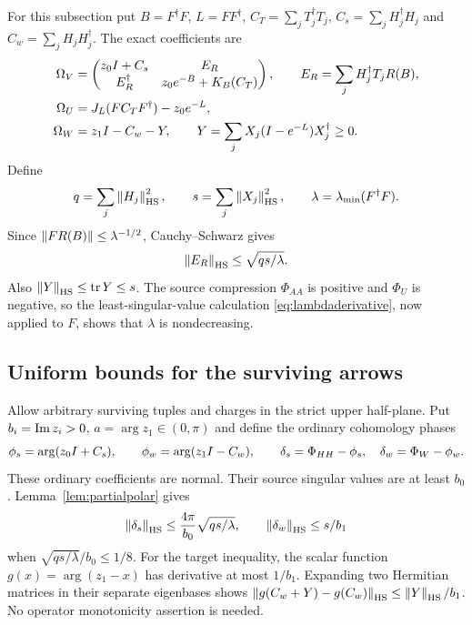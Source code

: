 For this subsection put $B=F^\dagger F$, $L=FF^\dagger$,
$C_T=\sum_jT_j^\dagger T_j$,
$C_s=\sum_jH_j^\dagger H_j$ and $C_w=\sum_jH_jH_j^\dagger$.
The exact coefficients are
\begin{equation}\label{eq:adaptedcoeff}
 \begin{split}
 \Omega_V&=
 \begin{pmatrix}
 z_0I+C_s&E_R\\
 E_R^\dagger&z_0e^{-B}+K_B(C_T)
 \end{pmatrix},
 \qquad E_R=\sum_jH_j^\dagger T_jR(B),\\
 \Omega_U&=J_L(FC_TF^\dagger)-z_0e^{-L},\\
 \Omega_W&=z_1I-C_w-Y,\qquad
 Y=\sum_jX_j(I-e^{-L})X_j^\dagger\geq0 .
 \end{split}
\end{equation}
Define
\begin{equation}\label{eq:qslambda}
 q=\sum_j\left\lVert H_j\right\rVert_{\mathrm{HS}}^2,\qquad
 s=\sum_j\left\lVert X_j\right\rVert_{\mathrm{HS}}^2,\qquad
 \lambda=\lambda_{\min}(F^\dagger F).
\end{equation}
Since $\left\lVert FR(B)\right\rVert\leq\lambda^{-1/2}$,
Cauchy--Schwarz gives
\begin{equation}\label{eq:mixedblockbound}
 \left\lVert E_R\right\rVert_{\mathrm{HS}}\leq\sqrt{qs/\lambda}.
\end{equation}
Also $\left\lVert Y\right\rVert_{\mathrm{HS}}\leq\operatorname{tr} Y\leq s$.
The source compression $\Phi_{AA}$ is positive and $\Phi_U$ is
negative, so the least-singular-value calculation
\eqref{eq:lambdaderivative}, now applied to $F$, shows that
$\lambda$ is nondecreasing.

\subsection{Uniform bounds for the surviving arrows}
Allow arbitrary surviving tuples and charges in the strict upper
half-plane. Put $b_i=\operatorname{Im} z_i>0$, $a=\arg z_1\in(0,\pi)$ and define
the ordinary cohomology phases
\[
 \phi_s=\arg(z_0I+C_s),\qquad
 \phi_w=\arg(z_1I-C_w),\qquad
 \delta_s=\Phi_{HH}-\phi_s,\quad \delta_w=\Phi_W-\phi_w.
\]
These ordinary coefficients are normal. Their source singular values
are at least $b_0$. Lemma~\ref{lem:partialpolar} gives
\begin{equation}\label{eq:delta}
 \left\lVert\delta_s\right\rVert_{\mathrm{HS}}\leq\frac{4\pi}{b_0}\sqrt{qs/\lambda},\qquad
 \left\lVert\delta_w\right\rVert_{\mathrm{HS}}\leq s/b_1
\end{equation}
when $\sqrt{qs/\lambda}/b_0\leq1/8$.
For the target inequality, the scalar function
$g(x)=\arg(z_1-x)$ has derivative at most $1/b_1$.
Expanding two Hermitian matrices in their separate eigenbases shows
$\left\lVert g(C_w+Y)-g(C_w)\right\rVert_{\mathrm{HS}}\leq\left\lVert Y\right\rVert_{\mathrm{HS}}/b_1$.
No operator monotonicity assertion is needed.

